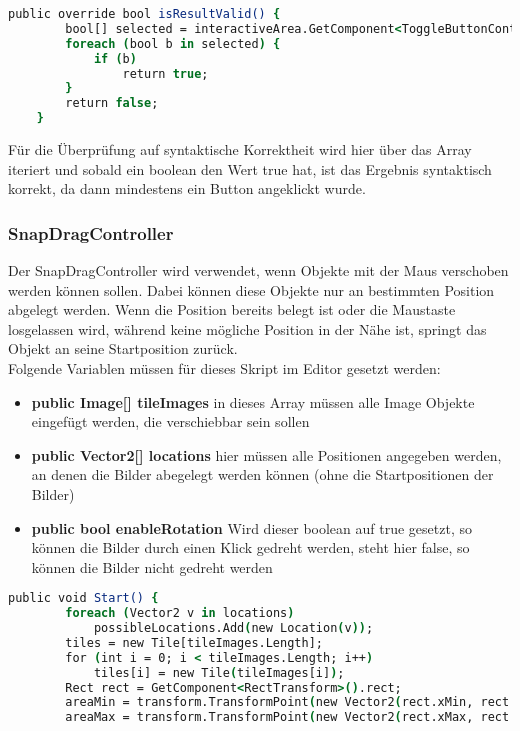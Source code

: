 {\begin{lstlisting}[language=csh, caption={isResultValid Methode in der Klasse von Rätsel 6}]
    public override bool isResultValid() {
        bool[] selected = interactiveArea.GetComponent<ToggleButtonController>().buttonStates;
        foreach (bool b in selected) {
            if (b)
                return true;
        }
        return false;
    }
\end{lstlisting}
Für die Überprüfung auf syntaktische Korrektheit wird hier über das Array iteriert und sobald ein boolean den Wert true hat, ist das Ergebnis syntaktisch korrekt, da dann mindestens ein Button angeklickt wurde.

\subsubsection{SnapDragController}
Der SnapDragController wird verwendet, wenn Objekte mit der Maus verschoben werden können sollen. Dabei können diese Objekte nur an bestimmten Position abgelegt werden. Wenn die Position bereits belegt ist oder die Maustaste losgelassen wird, während keine mögliche Position in der Nähe ist, springt das Objekt an seine Startposition zurück.\\
Folgende Variablen müssen für dieses Skript im Editor gesetzt werden:
\begin{itemize}
\item \textbf{ public Image[] tileImages} in dieses Array müssen alle Image Objekte eingefügt werden, die verschiebbar sein sollen
\item \textbf{public Vector2[] locations} hier müssen alle Positionen angegeben werden, an denen die Bilder abegelegt werden können (ohne die Startpositionen der Bilder)
\item \textbf{public bool enableRotation} Wird dieser boolean auf true gesetzt, so können die Bilder durch einen Klick gedreht werden, steht hier false, so können die Bilder nicht gedreht werden
\end{itemize}
\begin{lstlisting}[language=csh, caption={Start Methode des SnapDragControllers}]
public void Start() {
        foreach (Vector2 v in locations)
            possibleLocations.Add(new Location(v));
        tiles = new Tile[tileImages.Length];
        for (int i = 0; i < tileImages.Length; i++)
            tiles[i] = new Tile(tileImages[i]);
        Rect rect = GetComponent<RectTransform>().rect;
        areaMin = transform.TransformPoint(new Vector2(rect.xMin, rect.yMin));
        areaMax = transform.TransformPoint(new Vector2(rect.xMax, rect.yMax));

\end{lstlisting}}
